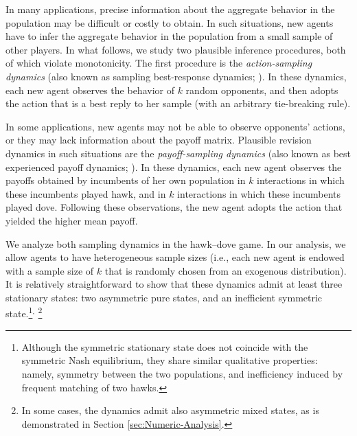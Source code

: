 \documentclass[12pt]{article}
\numberwithin{equation}{section}
\numberwithin{figure}{section}
\theoremstyle{definition}
\theoremstyle{plain}
\theoremstyle{plain}
\theoremstyle{plain}
\theoremstyle{remark}
\theoremstyle{plain}
\theoremstyle{plain}
\begin{document}
In many applications, precise information about the aggregate behavior in the population  may be difficult or costly to obtain. In such situations, new agents have to infer the aggregate behavior in the population from a small sample of other players. 
In what follows, we 
study two plausible inference procedures, both of which violate monotonicity. The first procedure is the \emph{action-sampling dynamics} (also known as sampling best-response dynamics;  \citealp{sandholm2001almost,osborne2003sampling}). In these dynamics, each new agent observes the behavior of $k$ random opponents, and then adopts the action that is a best reply to her sample (with an arbitrary tie-breaking rule). 

In some applications, new agents may not be able to observe  opponents' actions, or they may lack information about the payoff matrix. Plausible revision dynamics in such situations are the \emph{payoff-sampling dynamics}  (also known as best experienced payoff dynamics; \citealp{osborne1998games,sethi2000stability}). 
In these dynamics, each new agent observes the payoffs obtained by incumbents of her own population in $k$ interactions in which these incumbents played hawk, and in $k$ interactions in which these incumbents played dove. Following these observations, the new agent adopts the action that yielded the higher mean payoff.

We analyze both sampling dynamics in the hawk--dove game. In our analysis, we allow agents to have heterogeneous sample sizes (i.e., each new agent is endowed with a sample size of $k$ that is randomly chosen from an exogenous distribution). 
It is relatively straightforward to show that these dynamics admit at least three stationary states: 
two asymmetric pure states, and an inefficient symmetric state.\footnote{
Although the  symmetric stationary state does not coincide with the symmetric Nash equilibrium, they share similar qualitative properties: namely, symmetry between the two populations, and inefficiency induced by frequent matching of two hawks.}$^{,}$
\footnote{In some cases, the dynamics admit also asymmetric mixed states,
as is demonstrated in Section \ref{sec:Numeric-Analysis}.} 
\end{document}
